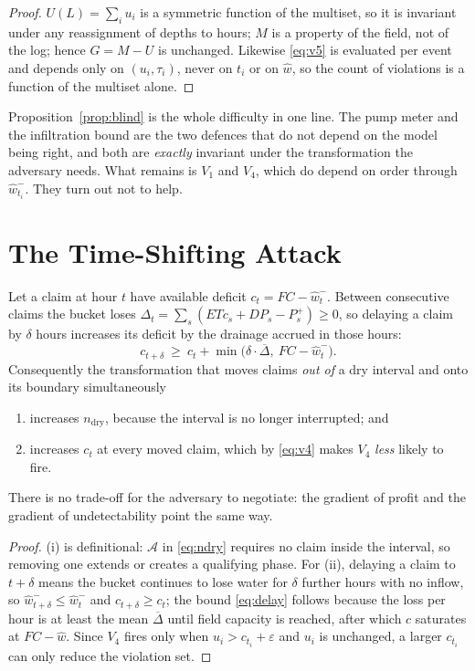 \begin{proof}
$U(L)=\sum_i u_i$ is a symmetric function of the multiset, so it is invariant
under any reassignment of depths to hours; $M$ is a property of the field, not of
the log; hence $G=M-U$ is unchanged. Likewise \eqref{eq:v5} is evaluated per
event and depends only on $(u_i,\tau_i)$, never on $t_i$ or on $\hat w$, so the
count of violations is a function of the multiset alone.
\end{proof}

Proposition~\ref{prop:blind} is the whole difficulty in one line. The pump meter
and the infiltration bound are the two defences that do not depend on the model
being right, and both are \emph{exactly} invariant under the transformation the
adversary needs. What remains is $V_1$ and $V_4$, which do depend on order
through $\hat w_{t_i}^{-}$. They turn out not to help.

\section{The Time-Shifting Attack}
\label{sec:timeshift}

\begin{proposition}
\label{prop:coincide}
Let a claim at hour $t$ have available deficit $c_t=FC-\hat w_t^{-}$. Between
consecutive claims the bucket loses
$\Delta_t=\sum_{s}(\mathit{ETc}_s+\mathit{DP}_s-P_s^{+})\ge 0$, so delaying a
claim by $\delta$ hours increases its deficit by the drainage accrued in those
hours:
\begin{equation}
c_{t+\delta}\ \ge\ c_t+\min\!\bigl(\delta\cdot\overline{\Delta},\ FC-\hat w_t^{-}\bigr).
\label{eq:delay}
\end{equation}
Consequently the transformation that moves claims \emph{out of} a dry interval
and onto its boundary simultaneously
\begin{enumerate}
\item[(i)] increases $n_{\mathrm{dry}}$, because the interval is no longer
interrupted; and
\item[(ii)] increases $c_t$ at every moved claim, which by \eqref{eq:v4} makes
$V_4$ \emph{less} likely to fire.
\end{enumerate}
There is no trade-off for the adversary to negotiate: the gradient of profit and
the gradient of undetectability point the same way.
\end{proposition}

\begin{proof}
(i) is definitional: $\mathcal{A}$ in \eqref{eq:ndry} requires no claim inside
the interval, so removing one extends or creates a qualifying phase. For (ii),
delaying a claim to $t+\delta$ means the bucket continues to lose water for
$\delta$ further hours with no inflow, so $\hat w_{t+\delta}^{-}\le\hat w_t^{-}$
and $c_{t+\delta}\ge c_t$; the bound \eqref{eq:delay} follows because the loss
per hour is at least the mean $\overline{\Delta}$ until field capacity is
reached, after which $c$ saturates at $FC-\hat w$. Since $V_4$ fires only when
$u_i>c_{t_i}+\varepsilon$ and $u_i$ is unchanged, a larger $c_{t_i}$ can only
reduce the violation set.
\end{proof}

